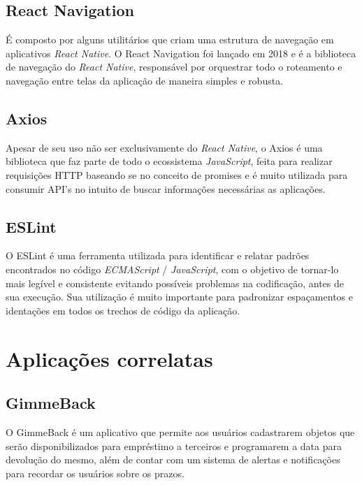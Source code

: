     \subsection{React Navigation}
    É composto por alguns utilitários que criam uma estrutura de navegação em aplicativos \textit{React Native}. O React Navigation foi lançado em 2018 e é a biblioteca de navegação do \textit{React Native}, responsável por orquestrar todo o roteamento e navegação entre telas da aplicação de maneira simples e robusta.
    
    \subsection{Axios}
    Apesar de seu uso não ser exclusivamente do \textit{React Native}, o Axios é uma biblioteca que faz parte de todo o ecossistema \textit{JavaScript}, feita para realizar requisições HTTP baseando se no conceito de promises e é muito utilizada para consumir API's no intuito de buscar informações necessárias as aplicações.
    
    \subsection{ESLint}
    O ESLint é uma ferramenta utilizada para identificar e relatar padrões encontrados no código \textit{ECMAScript} / \textit{JavaScript}, com o objetivo de tornar-lo mais legível e consistente evitando possíveis problemas na codificação, antes de sua execução. Sua utilização é muito importante para padronizar espaçamentos e identações em todos os trechos de código da aplicação.
  
      
    \section{Aplicações correlatas}
    
    \subsection{GimmeBack}
    
    O GimmeBack é um aplicativo que permite aos usuários cadastrarem objetos que serão disponibilizados para empréstimo a terceiros e programarem a data para devolução do mesmo, além de contar com um sistema de alertas e notificações para recordar os usuários sobre os prazos.
    
